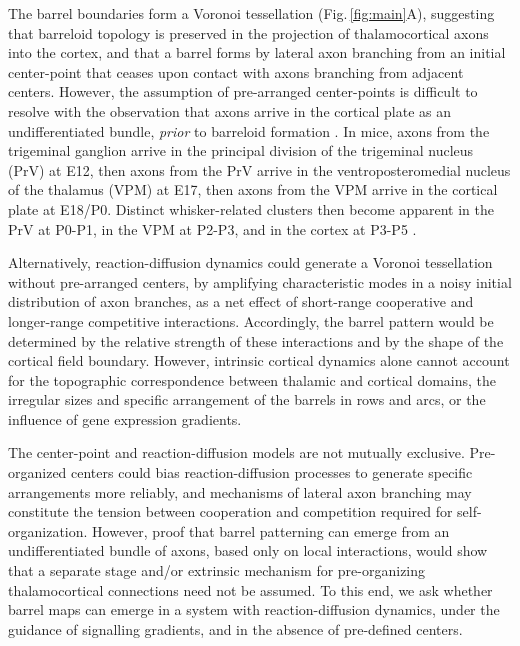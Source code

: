\documentclass[9pt,lineno]{elife}
\newcommand{\mpsix}[1]{\textcolor{colmpsix}{#1}}
\begin{document}
The barrel boundaries form a Voronoi tessellation \citep{senft_mouse_1991}
(Fig.\,\ref{fig:main}A), suggesting that barreloid topology is preserved in
the projection of thalamocortical axons into the cortex, and that a barrel
forms by lateral axon branching from an initial center-point that ceases upon
contact with axons branching from adjacent centers.  However, the assumption
of pre-arranged center-points is difficult to resolve with the observation
that axons arrive in the cortical plate as an undifferentiated bundle,
\emph{prior} to barreloid formation \citep{agmon_organized_1993}.  \mpsix{In
  mice, axons from the trigeminal ganglion arrive in the principal division of
  the trigeminal nucleus (PrV) at E12, then axons from the PrV arrive
  in the ventroposteromedial nucleus of the thalamus (VPM) at E17, then axons
  from the VPM arrive in the cortical plate at E18/P0. Distinct
  whisker-related clusters then become apparent in the PrV at P0-P1, in the
  VPM at P2-P3, and in the cortex at P3-P5}
\citep{erzurumlu_development_2012,sehara_neuronal_2011}.

Alternatively, reaction-diffusion dynamics could generate a Voronoi
tessellation without pre-arranged centers, by amplifying characteristic modes
in a noisy initial distribution of axon branches, as a net effect of
short-range cooperative and longer-range competitive
interactions. Accordingly, the barrel pattern would be determined by the
relative strength of these interactions and by the shape of the cortical field
boundary. However, intrinsic cortical dynamics alone cannot account for the
topographic correspondence between thalamic and cortical domains, the
irregular sizes and specific arrangement of the barrels in rows and arcs, or
the influence of gene expression gradients.

The center-point and reaction-diffusion models are not mutually
exclusive. Pre-organized centers could bias reaction-diffusion processes to
generate specific arrangements more reliably, and mechanisms of lateral axon
branching may constitute the tension between cooperation and competition
required for self-organization. However, proof that barrel patterning can
emerge from an undifferentiated bundle of axons, based only on local
interactions, would show that a separate stage and/or extrinsic mechanism for
pre-organizing thalamocortical connections need not be assumed. To this end,
we ask whether barrel maps can emerge in a system with reaction-diffusion
dynamics, under the guidance of signalling gradients, and in the absence of
pre-defined centers.
\end{document}
